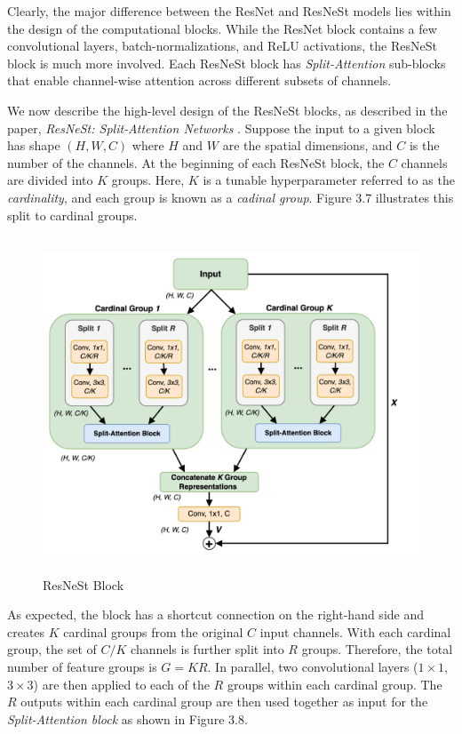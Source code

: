 \documentclass [MAS] {uclathes}
\begin{document}
Clearly, the major difference between the ResNet and ResNeSt models lies within the design of the computational blocks. While the ResNet block contains a few convolutional layers, batch-normalizations, and ReLU activations, the ResNeSt block is much more involved. Each ResNeSt block has \textit{Split-Attention} sub-blocks that enable channel-wise attention across different subsets of channels. 

We now describe the high-level design of the ResNeSt blocks, as described in the paper, \textit{ResNeSt: Split-Attention Networks} \cite{resnest}. Suppose the input to a given block has shape $(H, W, C)$ where $H$ and $W$ are the spatial dimensions, and $C$ is the number of the channels. At the beginning of each ResNeSt block, the $C$ channels are divided into $K$ groups. Here, $K$ is a tunable hyperparameter referred to as the \textit{cardinality}, and each group is known as a \textit{cadinal group}. Figure 3.7 illustrates this split to cardinal groups.

\begin{figure}[h]
\centering
\includegraphics[height = 100mm, width= 130mm]{imgs/resnest_block.png}
\caption{ResNeSt Block}
\label{fig:resnest_block}
\end{figure}

As expected, the block has a shortcut connection on the right-hand side and creates $K$ cardinal groups from the original $C$ input channels. With each cardinal group, the set of $C/K$ channels is further split into $R$ groups. Therefore, the total number of feature groups is $G = KR$. In parallel, two convolutional layers ($1 \times 1$, $3 \times 3$) are then applied to each of the $R$ groups within each cardinal group. The $R$ outputs within each cardinal group are then used together as input for the \textit{Split-Attention block} as shown in Figure 3.8.
\end{document}
